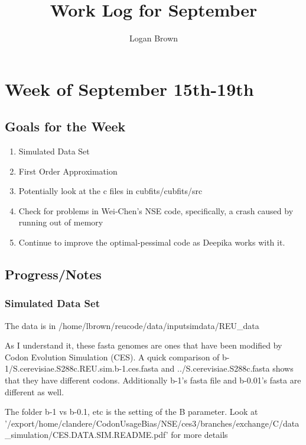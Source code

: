 \documentclass[11pt]{article} %
\title{Work Log for September}
\author{Logan Brown}
\begin{document}
\maketitle


\setcounter{section}{2} %
\setcounter{subsection}{-1}
\setcounter{subsubsection}{0}

\section{Week of September 15th-19th}
\subsection{Goals for the Week}
\begin{enumerate}
\item Simulated Data Set
\item First Order Approximation
\item Potentially look at the c files in cubfits/cubfits/src
\item Check for problems in Wei-Chen's NSE code, specifically, a crash caused by running out of memory
\item Continue to improve the optimal-pessimal code as Deepika works with it.

\end{enumerate}

\subsection{Progress/Notes}

\subsubsection{Simulated Data Set}
The data is in /home/lbrown/reucode/data/inputsimdata/REU\_data

As I understand it, these fasta genomes are ones that have been modified by Codon Evolution Simulation (CES). A quick comparison of  b-1/S.cerevisiae.S288c.REU.sim.b-1.ces.fasta and ../S.cerevisiae.S288c.fasta shows that they have different codons. Additionally b-1's fasta file and b-0.01's fasta are different as well.

The folder b-1 vs b-0.1, etc is the setting of the B parameter. Look at '/export/home/clandere/CodonUsageBias/NSE/ces3/branches/exchange/C/data\_simulation/CES.DATA.SIM.README.pdf' for more details
\end{document}
